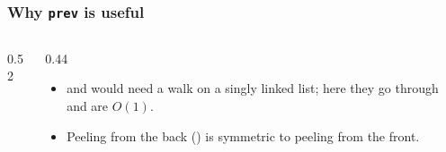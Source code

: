 \documentclass[aspectratio=169,10pt,compress]{beamer}
\begin{document}




\begin{frame}[t,fragile] \frametitle{Why \texttt{prev} is useful}
  \begin{columns}[T]
    \begin{column}{0.52\textwidth}
    \end{column}
    \begin{column}{0.44\textwidth}
      \small
      \begin{itemize}
        \item {} and  would need a
              walk on a singly linked list; here they go through
               and are $O(1)$.
        \item Peeling from the back () is
              symmetric to peeling from the front.
      \end{itemize}
    \end{column}
  \end{columns}
\end{frame}

\end{document}

